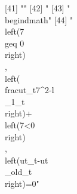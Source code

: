  [41] ""                                                                                                                                                                                                                                                                                                                                                                                                                                                                                                                                                                                                                                             
 [42] "%
 [43] "\\begin{dmath}"                                                                                                                                                                                                                                                                                                                                                                                                                                                                                                                                                                                                                               
 [44] "\\left(7\\geq 0\\right)\\, \\left(\\frac{{ut_{t}}}{7^{2}}-{{l\\_1}_{t}}\\right)+\\left(7<0\\right)\\, \\left({ut_{t}}-{{ut\\_old}_{t}}\\right)=0"                                                                                                                                                                                                                                                                                                                                                                                                                                                                                             
